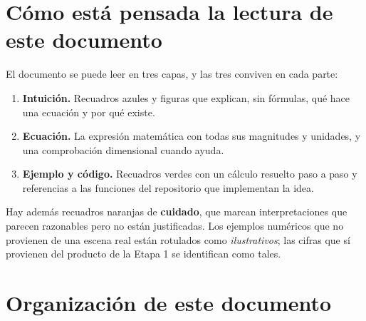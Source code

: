 \documentclass[11pt,a4paper]{article}
\begin{document}
\section{Cómo está pensada la lectura de este documento}
\label{sec:como-leer}

El documento se puede leer en tres capas, y las tres conviven en cada parte:
\begin{enumerate}
  \item \textbf{Intuición.} Recuadros azules y figuras que explican, sin fórmulas, qué hace una ecuación y por
        qué existe.
  \item \textbf{Ecuación.} La expresión matemática con todas sus magnitudes y unidades, y una comprobación
        dimensional cuando ayuda.
  \item \textbf{Ejemplo y código.} Recuadros verdes con un cálculo resuelto paso a paso y referencias a las
        funciones del repositorio que implementan la idea.
\end{enumerate}
Hay además recuadros naranjas de \textbf{cuidado}, que marcan interpretaciones que parecen razonables pero no
están justificadas. Los ejemplos numéricos que no provienen de una escena real están rotulados como
\emph{ilustrativos}; las cifras que sí provienen del producto de la Etapa 1 se identifican como tales.

\section{Organización de este documento}
\label{sec:organizacion}
\end{document}
